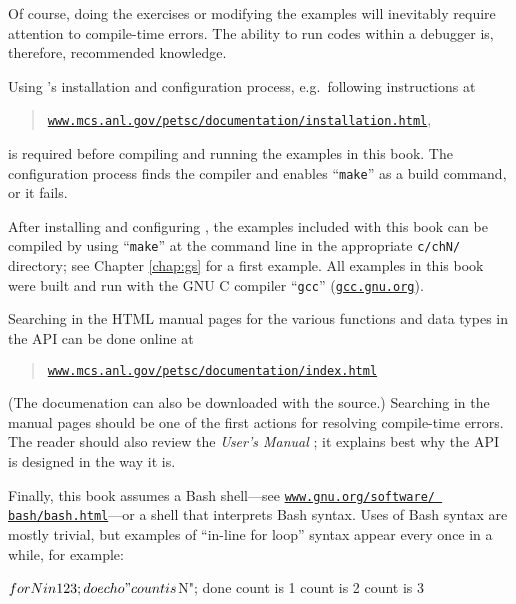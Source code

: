 Of course, doing the exercises or modifying the examples will inevitably require attention to compile-time errors.  The ability to run codes within a debugger is, therefore, recommended knowledge.

Using \PETSc's installation and configuration process, e.g.~following instructions at
\begin{quote}
\href{http://www.mcs.anl.gov/petsc/documentation/installation.html}{\texttt{www.mcs.anl.gov/petsc/documentation/installation.html}},
\end{quote}
is required before compiling and running the examples in this book.  The configuration process finds the compiler and enables ``\texttt{make}'' as a build command, or it fails.

After installing and configuring \PETSc, the examples included with this book can be compiled by using ``\texttt{make}'' at the command line in the appropriate \texttt{c/chN/} directory; see Chapter \ref{chap:gs} for a first example.  All examples in this book were built and run with the GNU C compiler ``\texttt{gcc}'' (\href{https://gcc.gnu.org/}{\texttt{gcc.gnu.org}}).

Searching in the \PETSc HTML manual pages for the various functions and data types in the API can be done online at
\begin{quote}
\href{http://www.mcs.anl.gov/petsc/documentation/index.html}{\texttt{www.mcs.anl.gov/petsc/documentation/index.html}}
\end{quote}
(The documenation can also be downloaded with the \PETSc source.)  Searching in the manual pages should be one of the first actions for resolving compile-time errors.  The reader should also review the \emph{\PETSc User's Manual} \citep{petsc-user-ref}; it explains best why the API is designed in the way it is.

Finally, this book assumes a Bash shell---see  \href{https://www.gnu.org/software/bash/bash.html}{\texttt{www.gnu.org/software/ bash/bash.html}}---or a shell that interprets Bash syntax.  Uses of Bash syntax are mostly trivial, but examples of ``in-line for loop'' syntax appear every once in a while, for example:
\begin{cline}
$ for N in 1 2 3; do echo "count is $N"; done
count is 1
count is 2
count is 3
\end{cline}
